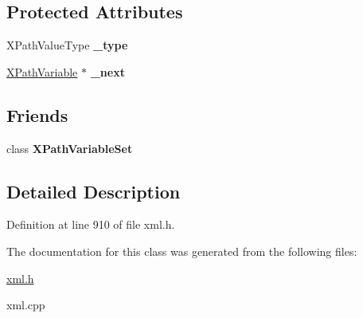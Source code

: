 \subsection*{Protected Attributes}
\begin{DoxyCompactItemize}
\item 
\hypertarget{classphys_1_1xml_1_1XPathVariable_a039fe72ced3d55be346498846eb29d85}{
XPathValueType {\bfseries \_\-type}}
\label{df/dee/classphys_1_1xml_1_1XPathVariable_a039fe72ced3d55be346498846eb29d85}

\item 
\hypertarget{classphys_1_1xml_1_1XPathVariable_a5425c11d82b053db83a70c0dcb84ea98}{
\hyperlink{classphys_1_1xml_1_1XPathVariable}{XPathVariable} $\ast$ {\bfseries \_\-next}}
\label{df/dee/classphys_1_1xml_1_1XPathVariable_a5425c11d82b053db83a70c0dcb84ea98}

\end{DoxyCompactItemize}
\subsection*{Friends}
\begin{DoxyCompactItemize}
\item 
\hypertarget{classphys_1_1xml_1_1XPathVariable_a6d8e28205e67fa0164160dd3cb547fe6}{
class {\bfseries XPathVariableSet}}
\label{df/dee/classphys_1_1xml_1_1XPathVariable_a6d8e28205e67fa0164160dd3cb547fe6}

\end{DoxyCompactItemize}


\subsection{Detailed Description}


Definition at line 910 of file xml.h.



The documentation for this class was generated from the following files:\begin{DoxyCompactItemize}
\item 
\hyperlink{xml_8h}{xml.h}\item 
xml.cpp\end{DoxyCompactItemize}

